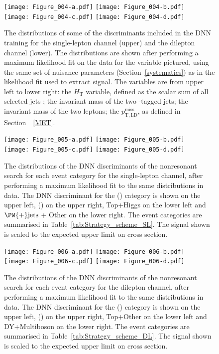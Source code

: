 \begin{figure}[htb!]
  \centering
  \texttt{[image: Figure\_004-a.pdf]}
  \texttt{[image: Figure\_004-b.pdf]}\\
  \texttt{[image: Figure\_004-c.pdf]}
  \texttt{[image: Figure\_004-d.pdf]}
  \caption{The distributions of some of the discriminants included in the DNN training for the single-lepton channel (upper) and the dilepton channel (lower). The distributions are shown after performing a maximum likelihood fit on the data for the variable pictured, using the same set of nuisance parameters (Section~\ref{systematics}) as in the likelihood fit used to extract signal. The variables are from upper left to lower right: the $H_{\mathrm{T}}$ variable, defined as the scalar sum of
    all selected jets \pt; the invariant mass of the two \Pbottom-tagged jets; the invariant mass of the two leptons; the $p_{\mathrm{T,LD}}^{\text{miss}}$, as defined in Section~~\ref{MET}.}
  \label{fig:DNN_input}
\end{figure}

\begin{figure}[htb!]
  \centering
  \texttt{[image: Figure\_005-a.pdf]}
  \texttt{[image: Figure\_005-b.pdf]}\\
  \texttt{[image: Figure\_005-c.pdf]}
  \texttt{[image: Figure\_005-d.pdf]}
  \caption{The distributions of the DNN discriminants of the nonresonant search for each event category for the single-lepton channel, after performing a maximum likelihood fit to the same distributions in data. The DNN discriminant for the \HH(\GGF) category is shown on the upper left, \HH(\VBF) on the upper right, Top+Higgs on the lower left and $\PW{+}\text{jets}$ + Other on the lower right. The event categories are summarised in Table~\ref{tab:Strategy_scheme_SL}. The signal shown is scaled to the expected upper limit on cross section.}
  \label{fig:SL_DNN}
\end{figure}

\begin{figure}[htb!]
  \centering
  \texttt{[image: Figure\_006-a.pdf]}
  \texttt{[image: Figure\_006-b.pdf]}\\
  \texttt{[image: Figure\_006-c.pdf]}
  \texttt{[image: Figure\_006-d.pdf]}
  \caption{The distributions of the DNN discriminants of the nonresonant search for each event category for the dilepton channel, after performing a maximum likelihood fit to the same distributions in data. The DNN discriminant for the \HH(\GGF) category is shown on the upper left, \HH(\VBF) on the upper right, Top+Other  on the lower left and DY+Multiboson on the lower right. The event categories are summarised in Table~\ref{tab:Strategy_scheme_DL}. The signal shown is scaled to the expected upper limit on cross section.}
  \label{fig:DL_DNN}
\end{figure}

